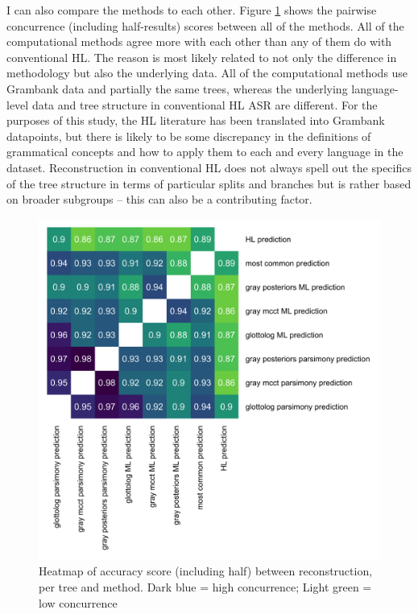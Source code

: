 \documentclass[12pt,letterpaper]{article}
\begin{document}
I can also compare the methods to each other. Figure \ref{heatmap_accuracy_score_methods} shows the pairwise concurrence (including half-results) scores between all of the methods. All of the computational methods agree more with each other than any of them do with conventional HL. The reason is most likely related to not only the difference in methodology but also the underlying data. All of the computational methods use Grambank data and partially the same trees, whereas the underlying language-level data and tree structure in conventional HL ASR are different. For the purposes of this study, the HL literature has been translated into Grambank datapoints, but there is likely to be some discrepancy in the definitions of grammatical concepts and how to apply them to each and every language in the dataset. Reconstruction in conventional HL does not always spell out the specifics of the tree structure in terms of particular splits and branches but is rather based on broader subgroups -- this can also be a contributing factor.


\begin{figure}[ht]
\centering
\includegraphics[width=12cm]{illustrations/plots_from_R/results/dist_heatmap_all_methods.png}
\caption{Heatmap of accuracy score (including half) between reconstruction, per tree and method. Dark blue = high concurrence; Light green = low concurrence}
\label{heatmap_accuracy_score_methods}
\end{figure}
\end{document}
